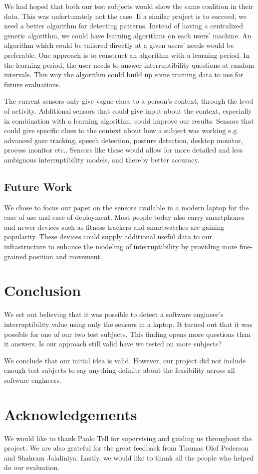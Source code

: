 \documentclass{sigchi}
\begin{document}
We had hoped that both our test subjects would show the same coalition in their data.
This was unfortunately not the case.
If a similar project is to succeed, we need a better algorithm for detecting patterns.
Instead of having a centralized generic algorithm, we could have learning algorithms on each users' machine.
An algorithm which could be tailored directly at a given users' needs would be preferable.
One approach is to construct an algorithm with a learning period.
In the learning period, the user needs to answer interruptibility questions at random intervals.
This way the algorithm could build up some training data to use for future evaluations.

The current sensors only give vague clues to a person's context, through the level of activity.
Additional sensors that could give input about the context, especially in combination with a learning algorithm, could improve our results.
Sensors that could give specific clues to the context about how a subject was working e.g. advanced gaze tracking, speech detection, posture detection, desktop monitor, process monitor etc..
Sensors like these would allow for more detailed and less ambiguous interruptibility models, and thereby better accuracy.

\subsection{Future Work}
We chose to focus our paper on the sensors available in a modern laptop for the ease of use and ease of deployment.
Most people today also carry smartphones and newer devices such as fitness trackers and smartwatches are gaining popularity.
These devices could supply additional useful data to our infrastructure to enhance the modeling of interruptibility by providing more fine-grained position and movement.

\section{Conclusion}
We set out believing that it was possible to detect a software engineer's interruptibility value using only the sensors in a laptop.
It turned out that it was possible for one of our two test subjects.
This finding opens more questions than it answers. Is our approach still valid have we tested on more subjects?

We conclude that our initial idea is valid.
However, our project did not include enough test subjects to say anything definite about the feasibility across all software engineers.

\section{Acknowledgements}
We would like to thank Paolo Tell for supervising and guiding us throughout the project.
We are also grateful for the great feedback from Thomas Olof Pederson and Shahram Jalaliniya.
Lastly, we would like to thank all the people who helped do our evaluation.

\balance


\end{document}
